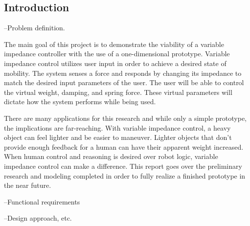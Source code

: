 \subsection*{Introduction}

\noindent --Problem definition. \par
The main goal of this project is to demonstrate the viability of a variable impedance controller with the use of a one-dimensional prototype. Variable impedance control utilizes user input in order to achieve a desired state of mobility. The system senses a force and responds by changing its impedance to match the desired input parameters of the user. The user will be able to control the virtual weight, damping, and spring force. These virtual parameters will dictate how the system performs while being used. \par
There are many applications for this research and while only a simple prototype, the implications are far-reaching. With variable impedance control, a heavy object can feel lighter and be easier to maneuver. Lighter objects that don't provide enough feedback for a human can have their apparent weight increased. When human control and reasoning is desired over robot logic, variable impedance control can make a difference. This report goes over the preliminary research and modeling completed in order to fully realize a finished prototype in the near future.

\noindent --Functional requirements

\noindent --Design approach, etc.